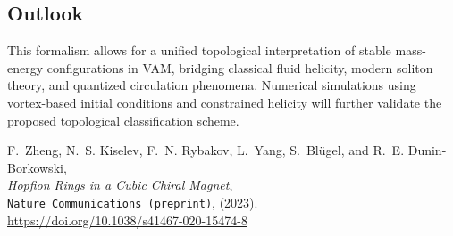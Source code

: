 \subsection{Outlook}

This formalism allows for a unified topological interpretation of stable mass-energy configurations in VAM, bridging classical fluid helicity, modern soliton theory, and quantized circulation phenomena. Numerical simulations using vortex-based initial conditions and constrained helicity will further validate the proposed topological classification scheme.

\begin{thebibliography}{9}

    F.~Zheng, N.~S. Kiselev, F.~N. Rybakov, L.~Yang, S.~Blügel, and R.~E. Dunin-Borkowski,\\
    \emph{Hopfion Rings in a Cubic Chiral Magnet},\\
    \texttt{Nature Communications (preprint)}, (2023).\\
    \url{https://doi.org/10.1038/s41467-020-15474-8}

\end{thebibliography}